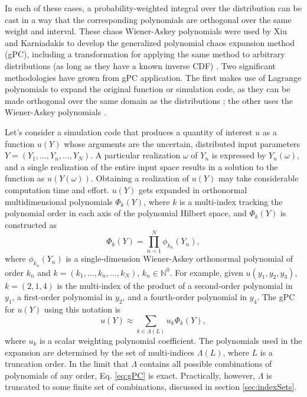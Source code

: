 In each of these cases, a probability-weighted
integral over the distribution can be cast in a way that the corresponding polynomials are orthogonal over the
same weight and interval.  These chaos Wiener-Askey polynomials were used by Xiu and Karniadakis to develop
the generalized polynomial chaos expansion method (gPC), including a transformation for applying the same
method to arbitrary distributions (as long as they have a known inverse CDF) \cite{xiu}.  Two significant
methodologies have grown from gPC application.  The first makes use of Lagrange polynomials to expand the
original function or simulation code, as they can be made orthogonal over the same domain as the
distributions \cite{SCLagrange}; the other uses the Wiener-Askey polynomials \cite{xiu}. 

Let's consider a simulation code that produces a quantity of interest $u$ as a function $u(Y)$ whose arguments are
the uncertain, distributed input
parameters $Y=(Y_1,\ldots,Y_n,\ldots,Y_N)$.  A particular realization $\omega$ of $Y_n$ is expressed by
$Y_n(\omega)$, and a single realization of the entire input space results in a solution to the function as
$u(Y(\omega))$. Obtaining a realization of $u(Y)$ may take considerable computation time and
effort.
$u(Y)$ gets expanded in orthonormal multidimensional polynomials $\Phi_k(Y)$, where $k$ is a multi-index tracking
the polynomial order in each axis of the polynomial Hilbert space, and $\Phi_k(Y)$ is constructed as
\begin{equation}\label{eq:gPC}
  \Phi_k(Y) = \prod_{n=1}^N \phi_{k_n}(Y_n),
\end{equation}
where $\phi_{k_n}(Y_n)$ is a single-dimension Wiener-Askey orthonormal polynomial of order $k_n$ and
$k=(k_1,\ldots,k_n,\ldots,k_N)$, $k_n\in\mathbb{N}^0$.  For example, given $u(y_1,y_2,y_3)$, $k=(2,1,4)$ 
is the multi-index of the
product of a second-order polynomial in $y_1$, a first-order polynomial in $y_2$, and a fourth-order
polynomial in $y_4$. The gPC for $u(Y)$ using this notation is
\begin{equation}
  u(Y) \approx \sum_{k\in\Lambda(L)} u_k\Phi_k(Y),
\end{equation}
where $u_k$ is a scalar weighting polynomial coefficient. The polynomials used in the expansion are determined
by the set of multi-indices $\Lambda(L)$, where $L$ is a truncation order.  In the limit
that $\Lambda$ contains all possible combinations of polynomials of any order, Eq. \ref{eq:gPC} is exact.
Practically, however, $\Lambda$ is truncated to some finite set of combinations, discussed in section
\ref{sec:indexSets}.

